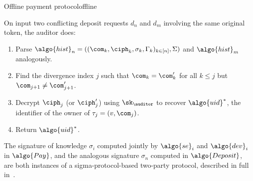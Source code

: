 \begin{protocolbox}{Offline payment protocol}{offline}
\begin{description}
\begin{enumerate}
    \end{enumerate}

  \item[$\algo{uid}^* \leftarrow \algo{Trace}(d_n, d_m)$ :] On input two
    conflicting deposit requests $d_n$ and $d_m$ involving the same original
    token, the auditor does:

    \begin{enumerate}

      \item Parse $\algo{hist}_n = ((\com_k, \ciph_k, \sigma_k, \Gamma_k)_{k
        \in [n]}, \Sigma)$ and $\algo{hist}_m$ analogously.

      \item Find the divergence index $j$ such that $\com_k = \com'_k$ for all
        $k \leq j$ but $\com_{j+1} \neq \com'_{j+1}$.

      \item Decrypt $\ciph_j$ (or $\ciph'_j$) using $\sk_{\auditor}$ to recover
        $\algo{uid}^*$, the identifier of the owner of $\tau_j = (v, \com_j)$.

      \item Return $\algo{uid}^*$.

    \end{enumerate}

\end{description}

\end{protocolbox}

The signature of knowledge $\sigma_i$ computed jointly by $\algo{se}_i$ and
$\algo{dev}_i$ in $\algo{Pay}$, and the analogous signature $\sigma_n$ computed
in $\algo{Deposit}$, are both instances of a sigma-protocol-based two-party
protocol, described in full in~.
